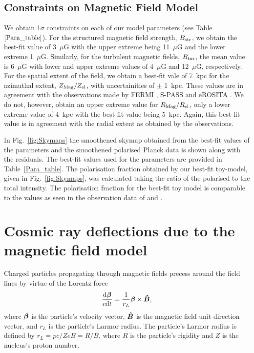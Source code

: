 \documentclass[usenatbib]{mnras}
\newcommand{\bfm}[1]{\mbox{\boldmath$ #1 $}}
\begin{document}
\subsection{Constraints on Magnetic Field Model}
\label{Results}
We obtain 1$\sigma$ constraints on each of our model parameters (see Table~$\ref{Para_table}$). For the structured magnetic field strength, $B_{\rm str}$, we obtain the best-fit value of 3~$\mu$G with the upper extreme being 11~$\mu$G and the lower extreme 1~$\mu$G. Similarly, for the turbulent magnetic fields, $B_{\rm tur}$, the mean value is 6~$\mu$G with lower and upper extreme values of 4~$\mu$G and 12~$\mu$G, respectively. For the spatial extent of the field, we obtain a best-fit vale of 7~kpc for the azimuthal extent, $Z_{\rm Mag}/Z_{\rm el}$, with uncertainities of $\pm$ 1~kpc. These values are in agreement with the observations made by FERMI \citep{Su_2010}, S-PASS \citep{Carretti_2013} and eROSITA \citep{eROSITA}. We do not, however, obtain an upper extreme value for $R_{\rm Mag}/R_{\rm el}$, only a lower extreme value of 4~kpc with the best-fit value being 5~kpc. Again, this best-fit value is in agreement with the radial extent as obtained by the observations.

In Fig.~\ref{fig:Skymaps} the smoothened skymap obtained from the best-fit values of the parameters and the smoothened polarised Planck data is shown along with the residuals. The best-fit values used for the parameters are provided in Table~\ref{Para_table}. 
The polarisation fraction obtained by our best-fit toy-model, given in Fig.~\ref{fig:Skymaps}, was calculated taking the ratio of the polarised to the total intensity. The polarisation fraction for the best-fit toy model is comparable to the values as seen in the observation data of \citet{WMAP_Page} and \citet{Carretti_2013}.





\section{Cosmic ray deflections due to the magnetic field model}
\label{Deflections}

Charged particles propagating through magnetic fields precess around the field lines by virtue of the Lorentz force 
\begin{eqnarray}
\frac{{\rm d}\bfm{\beta}}{c{\rm d}t} = \frac{1}{r_{L}}\bfm{\beta}\times \bfm{\hat{B}}, 
\end{eqnarray}
where $\bfm{\beta}$ is the particle's velocity vector, $\bfm{\hat{B}}$ is the magnetic field unit direction vector, and $r_{L}$ is the particle's Larmor radius. The particle's Larmor radius is defined by $r_{L}=pc/ZeB=R/B$, where $R$ is the particle's rigidity and $Z$ is the nucleus's proton number. 
\end{document}
